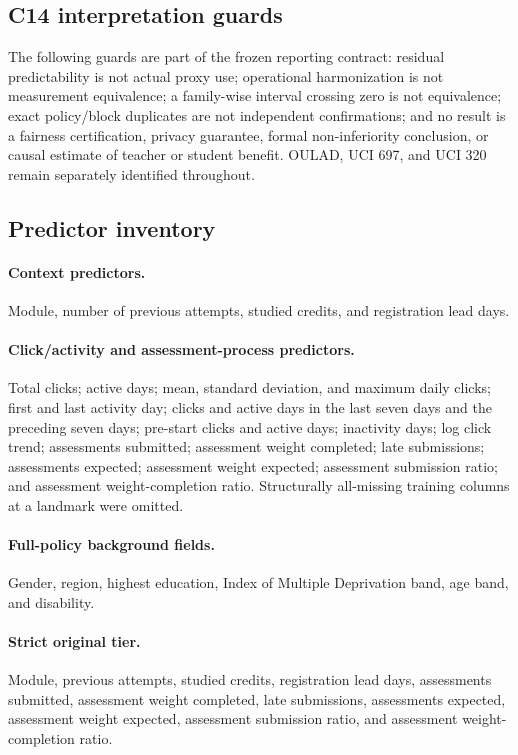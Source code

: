 \subsection{C14 interpretation guards}

The following guards are part of the frozen reporting contract: residual predictability is not actual proxy use; operational harmonization is not measurement equivalence; a family-wise interval crossing zero is not equivalence; exact policy/block duplicates are not independent confirmations; and no result is a fairness certification, privacy guarantee, formal non-inferiority conclusion, or causal estimate of teacher or student benefit. OULAD, UCI 697, and UCI 320 remain separately identified throughout.

\subsection{Predictor inventory}

\paragraph{Context predictors.}
Module, number of previous attempts, studied credits, and registration lead days.

\paragraph{Click/activity and assessment-process predictors.}
Total clicks; active days; mean, standard deviation, and maximum daily clicks; first and last activity day; clicks and active days in the last seven days and the preceding seven days; pre-start clicks and active days; inactivity days; log click trend; assessments submitted; assessment weight completed; late submissions; assessments expected; assessment weight expected; assessment submission ratio; and assessment weight-completion ratio. Structurally all-missing training columns at a landmark were omitted.

\paragraph{Full-policy background fields.}
Gender, region, highest education, Index of Multiple Deprivation band, age band, and disability.

\paragraph{Strict original tier.}
Module, previous attempts, studied credits, registration lead days, assessments submitted, assessment weight completed, late submissions, assessments expected, assessment weight expected, assessment submission ratio, and assessment weight-completion ratio.


